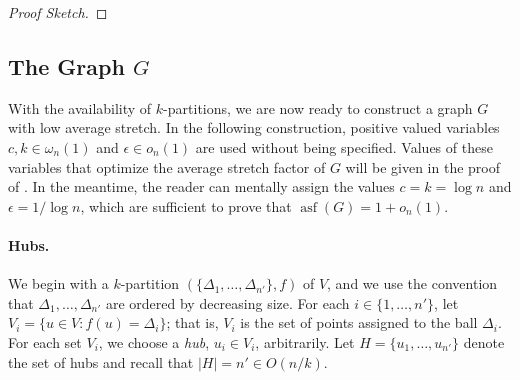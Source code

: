 \documentclass{patmorin}
\DeclareMathOperator{\asf}{asf}
\begin{document}
\begin{proof}[Proof Sketch]
\end{proof}

\subsection{The Graph $G$}

With the availability of $k$-partitions, we are now ready to construct
a graph $G$ with low average stretch.  In the following construction,
positive valued variables $c,k\in\omega_n(1)$ and $\epsilon\in o_n(1)$
are used without being specified.  Values of these variables that
optimize the average stretch factor of $G$ will be given in the proof
of .  In the meantime, the reader can mentally assign the
values $c=k=\log n$ and $\epsilon = 1/\log n$, which are sufficient to
prove that $\asf(G)=1+o_n(1)$.

\paragraph{Hubs.}

We begin with a $k$-partition $(\{\Delta_1,\ldots,\Delta_{n'}\},f)$
of $V$, and we use the convention that $\Delta_1,\ldots,\Delta_{n'}$
are ordered by decreasing size.  For each $i\in \{1,\ldots,n'\}$,
let $V_i=\{u\in V : f(u)=\Delta_i\}$; that is, $V_i$ is the set of
points assigned to the ball $\Delta_i$.  For each set $V_i$, we choose
a \emph{hub}, $u_i\in V_i$, arbitrarily. Let $H=\{u_1,\ldots,u_{n'}\}$ denote
the set of hubs and recall that $|H|=n'\in O(n/k)$.

\begin{figure}
  \begin{minipage}{.47\textwidth}
  \end{minipage}%
  \hspace{.06\textwidth}
  \begin{minipage}{.47\textwidth}
  \end{minipage}
\end{figure}
\end{document}
